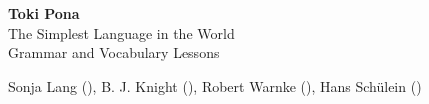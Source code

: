 



\begin{titlepage}%
    \begin{center}
        \vspace{1.25cm}

        {%
            \fontsize{110pt}{110pt}\selectfont\bfseries
            Toki Pona
        }\\[1.475cm]
        {%
        \fontsize{25pt}{25pt}\selectfont%
        The Simplest Language in the World\\[6mm]
        Grammar and Vocabulary Lessons
        }

        \vfill

        {%
            \fontsize{12pt}{12pt}\selectfont%
            Sonja Lang (),
            B. J. Knight (),
            Robert Warnke (),
            Hans Schülein ()
        }

        \vspace{7mm}
    \end{center}
\end{titlepage}
\restoregeometry

\thispagestyle{empty}